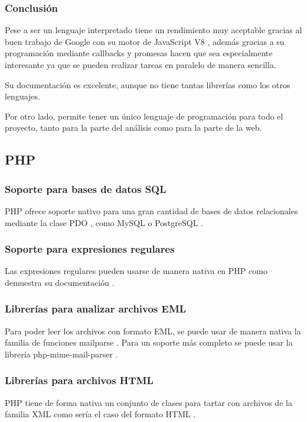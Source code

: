 \subsubsection{Conclusión}
Pese a ser un lenguaje interpretado tiene un rendimiento muy aceptable gracias al buen trabajo de Google con su motor de JavaScript V8 \cite{node_engine}, además gracias a su programación mediante callbacks y promesas hacen que sea especialmente interesante ya que se pueden realizar tareas en paralelo de manera sencilla.

Su documentación es excelente, aunque no tiene tantas librerías como los otros lenguajes.

Por otro lado, permite tener un único lenguaje de programación para todo el proyecto, tanto para la parte del análisis como para la parte de la web. 


\subsection{PHP}

\subsubsection{Soporte para bases de datos SQL}\label{php_bases_de_datos}
PHP ofrece soporte nativo para una gran cantidad de bases de datos relacionales mediante la clase PDO \cite{php_pdo}, como MySQL o PostgreSQL \cite{php_pdo_drivers}.

\subsubsection{Soporte para expresiones regulares}
Las expresiones regulares pueden usarse de manera nativa en PHP como demuestra su documentación \cite{php_pcre}.

\subsubsection{Librerías para analizar archivos EML}
Para poder leer los archivos con formato EML, se puede usar de manera nativa la familia de funciones mailparse \cite{php_Mailparse}. Para un soporte más completo se puede usar la librería php-mime-mail-parser \cite{php_php_mime_mail_parser}.

\subsubsection{Librerías para archivos HTML}
PHP tiene de forma nativa un conjunto de clases para tartar con archivos de la familia XML como sería el caso del formato HTML \cite{php_dom}.

